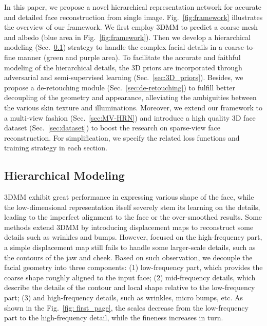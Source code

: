 \documentclass[10pt,twocolumn,letterpaper]{article}
\begin{document}
In this paper, we propose a novel hierarchical representation network for accurate and detailed face reconstruction from single image. Fig.~\ref{fig:framework} illustrates the overview of our framework. We first employ 3DMM to predict a coarse mesh and albedo (blue area in Fig.~\ref{fig:framework}). Then we develop a hierarchical modeling (Sec.~\ref{sec:hierachical_modeling}) strategy to handle the complex facial details in a coarse-to-fine manner (green and purple area). To facilitate the accurate and faithful modeling of the hierarchical details, the 3D priors are incorporated through adversarial and semi-supervised learning (Sec.~\ref{sec:3D_priors}). Besides, we propose a de-retouching module (Sec.~\ref{sec:de-retouching}) to fulfill better decoupling of the geometry and appearance, alleviating the ambiguities between the various skin texture and illuminations. Moreover, we extend our framework to a multi-view fashion (Sec.~\ref{sec:MV-HRN}) and introduce a high quality 3D face dataset (Sec.~\ref{sec:dataset}) to boost the research on sparse-view face reconstruction. For simplification, we specify the related loss functions and training strategy in each section.

\subsection{Hierarchical Modeling} \label{sec:hierachical_modeling}

3DMM exhibit great performance in expressing various shape of the face, while the low-dimensional representation itself severely stem its learning on the details, leading to the imperfect alignment to the face or the over-smoothed results. Some methods extend 3DMM by introducing displacement maps to reconstruct some details such as wrinkles and bumps. However, focused on the high-frequency part, a simple displacement map still fails to handle some larger-scale details, such as the contours of the jaw and cheek. Based on such observation, we decouple the facial geometry into three components: (1) low-frequency part, which provides the coarse shape roughly aligned to the input face; (2) mid-frequency details, which describe the details of the contour and local shape relative to the low-frequency part; (3) and high-frequency details, such as wrinkles, micro bumps, etc. As shown in the Fig.~\ref{fig: first_page}, the scales decrease from the low-frequency part to the high-frequency detail, while the fineness increases in turn.
\end{document}
